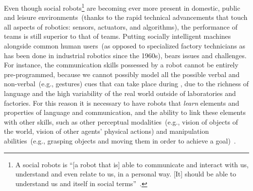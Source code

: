 
Even though social robots\footnote{A social robots is ``[a robot that is] able to communicate and interact with us, understand and even relate to us, in a personal way. [It] should be able to understand us and itself in social terms''~\cite{breazeal:2002:dsr}.} are becoming ever more present in domestic, public and leisure environments~(thanks to the rapid technical advancements that touch all aspects of robotics: sensors, actuators, and algorithms), the performance of \hh{} teams is still superior to that of \hr{} teams.
Putting socially intelligent machines alongside common human users~(as opposed to specialized factory technicians as has been done in industrial robotics since the 1960s), bears issues and challenges.
For instance, the communication skills possessed by a robot cannot be entirely pre-programmed, because we cannot possibly model all the possible verbal and non-verbal~(e.g., gestures) cues that can take place during \hri, due to the richness of language and the high variability of the real world outside of laboratories and factories.
For this reason it is necessary to have robots that \emph{learn} elements and properties of language and communication, and the ability to link these elements with other skills, such as other perceptual modalities~(e.g., vision of objects of the world, vision of other agents' physical actions) and manipulation abilities~(e.g., grasping objects and moving them in order to achieve a goal)~\cite{steels:2003:trendscogsci}.

